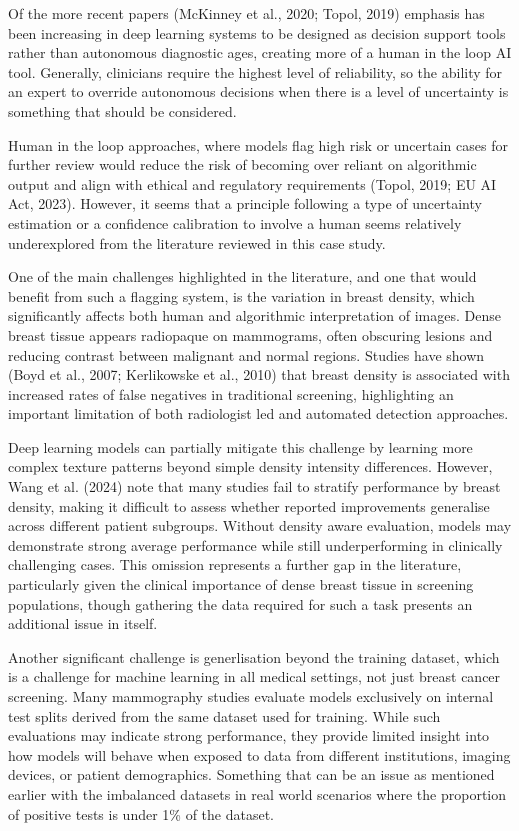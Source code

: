 Of the more recent papers (McKinney et al., 2020; Topol, 2019) emphasis has been increasing in deep learning systems to be designed as decision support tools rather than autonomous diagnostic ages, creating more of a human in the loop AI tool. Generally, clinicians require the highest level of reliability, so the ability for an expert to override autonomous decisions when there is a level of uncertainty is something that should be considered.

Human in the loop approaches, where models flag high risk or uncertain cases for further review would reduce the risk of becoming over reliant on algorithmic output and align with ethical and regulatory requirements (Topol, 2019; EU AI Act, 2023). However, it seems that a principle following a type of uncertainty estimation or a confidence calibration to involve a human seems relatively underexplored from the literature reviewed in this case study.

One of the main challenges highlighted in the literature, and one that would benefit from such a flagging system, is the variation in breast density, which significantly affects both human and algorithmic interpretation of images. Dense breast tissue appears radiopaque on mammograms, often obscuring lesions and reducing contrast between malignant and normal regions. Studies have shown (Boyd et al., 2007; Kerlikowske et al., 2010) that breast density is associated with increased rates of false negatives in traditional screening, highlighting an important limitation of both radiologist led and automated detection approaches.

Deep learning models can partially mitigate this challenge by learning more complex texture patterns beyond simple density intensity differences. However, Wang et al. (2024) note that many studies fail to stratify performance by breast density, making it difficult to assess whether reported improvements generalise across different patient subgroups. Without density aware evaluation, models may demonstrate strong average performance while still underperforming in clinically challenging cases. This omission represents a further gap in the literature, particularly given the clinical importance of dense breast tissue in screening populations, though gathering the data required for such a task presents an additional issue in itself.

Another significant challenge is generlisation beyond the training dataset, which is a challenge for machine learning in all medical settings, not just breast cancer screening. Many mammography studies evaluate models exclusively on internal test splits derived from the same dataset used for training. While such evaluations may indicate strong performance, they provide limited insight into how models will behave when exposed to data from different institutions, imaging devices, or patient demographics. Something that can be an issue as mentioned earlier with the imbalanced datasets in real world scenarios where the proportion of positive tests is under 1\% of the dataset.

